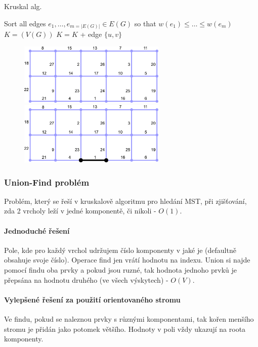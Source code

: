 \begin{algorithm}
\caption{Kruskal alg.}
\begin{algorithmic}
\State Sort all edges $e_1,\dots, e_{m=\vert E(G)\vert} \in E(G)$ so that $w(e_1) \leq \hdots \leq w(e_m)$
\State $K=(V(G))$
    \State $K = K$ + edge $\{u,v\}$
  \EndIf
\EndFor
\end{algorithmic}
\end{algorithm}

\begin{figure}[h]
    \begin{center}
        \includegraphics[width=70mm]{spolecne/02/images/kruskal01}
        \hspace{10px}
        \includegraphics[width=70mm]{spolecne/02/images/kruskal02}
    \end{center}
\end{figure}

\subsubsection{Union-Find problém}
Problém, který se řeší v kruskalově algoritmu pro hledání MST, při zjišťování, zda 2 vrcholy leží v jedné komponentě, či nikoli - $O(1)$.

\paragraph{Jednoduché řešení} Pole, kde pro každý vrchol udržujem číslo komponenty v jaké je (defaultně obsahuje svoje číslo). Operace find jen vrátí hodnotu na indexu. Union si najde pomocí findu oba prvky a pokud jsou ruzné, tak hodnota jednoho prvků je přepsána na hodnotu druhého (ve všech výskytech) - $O(V)$.

\paragraph{Vylepšené řešení za použití orientovaného stromu}
Ve findu, pokud se naleznou prvky s různými komponentami, tak kořen menšího stromu je přidán jako potomek většího. Hodnoty v poli vždy ukazují na roota komponenty.

